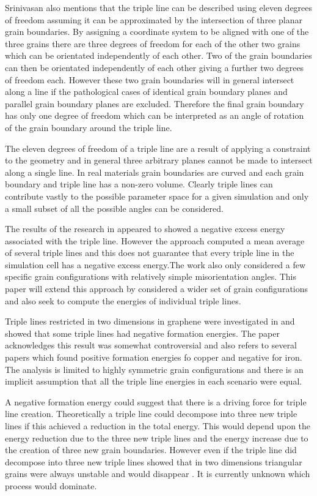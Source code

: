 \documentclass[12pt,a4paper]{book}
\begin{document}
Srinivasan also mentions that the triple line can be described using eleven degrees of freedom assuming it can be approximated by the intersection of three planar grain boundaries. By assigning a coordinate system to be aligned with one of the three grains there are three degrees of freedom for each of the other two grains which can be orientated independently of each other. Two of the grain boundaries can then be orientated independently of each other giving a further two degrees of freedom each. However these two grain boundaries will in general intersect along a line if the pathological cases of identical grain boundary planes and parallel grain boundary planes are excluded. Therefore the final grain boundary has only one degree of freedom which can be interpreted as an angle of rotation of the grain boundary around the triple line.

The eleven degrees of freedom of a triple line are a result of applying a constraint to the geometry and in general three arbitrary planes cannot be made to intersect along a single line.  In real materials grain boundaries are curved and each grain boundary and triple line has a non-zero volume. Clearly triple lines can contribute vastly to the possible parameter space for a given simulation and only a small subset of all the possible angles can be considered.

The results of the research in \cite{Srinivasan1999} appeared to showed a negative excess energy associated with the triple line. However the approach computed a mean average of several triple lines and this does not guarantee that every triple line in the simulation cell has a negative excess energy.The work also only considered a few specific grain configurations with relatively simple misorientation angles. This paper will extend this approach by considered a wider set of grain configurations and also seek to compute the energies of individual triple lines.

Triple lines restricted in two dimensions in graphene were  investigated in \citep{Hirvonen2017} and showed that some triple lines had negative formation energies. The paper acknowledges this result was somewhat controversial and also refers to several papers which found positive formation energies fo copper and negative for iron. The analysis is limited to highly symmetric grain configurations and there is an implicit assumption that all the triple line energies in each scenario were equal.

A negative formation energy could suggest that there is a driving force for triple line creation. Theoretically a triple line could decompose into three new triple lines if this achieved a reduction in the total energy. This would depend upon the energy reduction due to the three new triple lines and the energy increase due to the creation of three new grain boundaries. However even if the triple line did decompose into three new triple lines \citeauthor{Shvindlerman2005} showed that in two dimensions triangular grains were always unstable and would disappear \cite{Shvindlerman2005}. It is currently unknown which process would dominate. 
\end{document}
